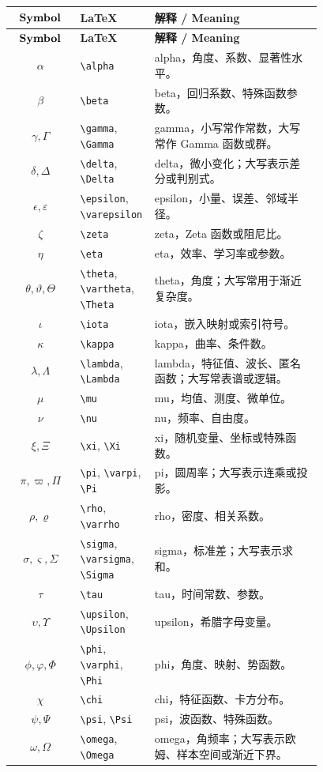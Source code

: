 \documentclass[11pt]{article}
\begin{document}
\begin{longtable}{>{$}c<{$} p{0.24\linewidth} p{0.54\linewidth}}
\hline
\text{\textbf{Symbol}} & \textbf{LaTeX} & \textbf{解释 / Meaning} \\
\hline
\endfirsthead
\hline
\text{\textbf{Symbol}} & \textbf{LaTeX} & \textbf{解释 / Meaning} \\
\hline
\endhead
\alpha & \verb|\alpha| & alpha，角度、系数、显著性水平。 \\
\beta & \verb|\beta| & beta，回归系数、特殊函数参数。 \\
\gamma, \Gamma & \verb|\gamma|, \verb|\Gamma| & gamma，小写常作常数，大写常作 Gamma 函数或群。 \\
\delta, \Delta & \verb|\delta|, \verb|\Delta| & delta，微小变化；大写表示差分或判别式。 \\
\epsilon, \varepsilon & \verb|\epsilon|, \verb|\varepsilon| & epsilon，小量、误差、邻域半径。 \\
\zeta & \verb|\zeta| & zeta，Zeta 函数或阻尼比。 \\
\eta & \verb|\eta| & eta，效率、学习率或参数。 \\
\theta, \vartheta, \Theta & \verb|\theta|, \verb|\vartheta|, \verb|\Theta| & theta，角度；大写常用于渐近复杂度。 \\
\iota & \verb|\iota| & iota，嵌入映射或索引符号。 \\
\kappa & \verb|\kappa| & kappa，曲率、条件数。 \\
\lambda, \Lambda & \verb|\lambda|, \verb|\Lambda| & lambda，特征值、波长、匿名函数；大写常表谱或逻辑。 \\
\mu & \verb|\mu| & mu，均值、测度、微单位。 \\
\nu & \verb|\nu| & nu，频率、自由度。 \\
\xi, \Xi & \verb|\xi|, \verb|\Xi| & xi，随机变量、坐标或特殊函数。 \\
\pi, \varpi, \Pi & \verb|\pi|, \verb|\varpi|, \verb|\Pi| & pi，圆周率；大写表示连乘或投影。 \\
\rho, \varrho & \verb|\rho|, \verb|\varrho| & rho，密度、相关系数。 \\
\sigma, \varsigma, \Sigma & \verb|\sigma|, \verb|\varsigma|, \verb|\Sigma| & sigma，标准差；大写表示求和。 \\
\tau & \verb|\tau| & tau，时间常数、参数。 \\
\upsilon, \Upsilon & \verb|\upsilon|, \verb|\Upsilon| & upsilon，希腊字母变量。 \\
\phi, \varphi, \Phi & \verb|\phi|, \verb|\varphi|, \verb|\Phi| & phi，角度、映射、势函数。 \\
\chi & \verb|\chi| & chi，特征函数、卡方分布。 \\
\psi, \Psi & \verb|\psi|, \verb|\Psi| & psi，波函数、特殊函数。 \\
\omega, \Omega & \verb|\omega|, \verb|\Omega| & omega，角频率；大写表示欧姆、样本空间或渐近下界。 \\
\hline
\end{longtable}
\end{document}
